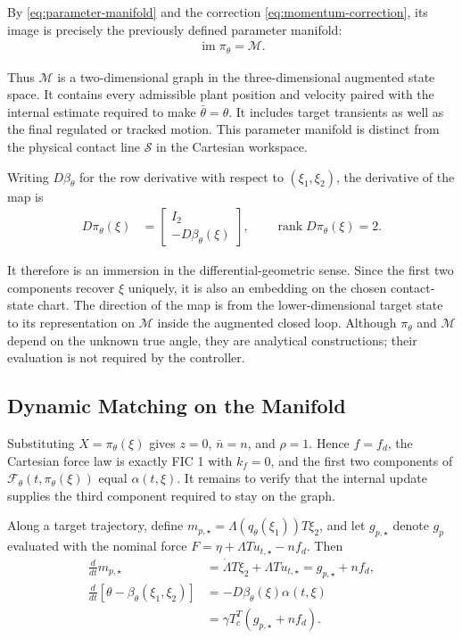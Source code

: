 \documentclass[10pt,journal,letterpaper]{IEEEtran}
\begin{document}
By \eqref{eq:parameter-manifold} and the correction \eqref{eq:momentum-correction}, its image is precisely the previously defined parameter manifold:
\begin{align*}
\operatorname{im}\pi_\theta=\mathcal M.
\end{align*}

Thus $\mathcal M$ is a two-dimensional graph in the three-dimensional augmented state space. It contains every admissible plant position and velocity paired with the internal estimate required to make $\bar\theta=\theta$. It includes target transients as well as the final regulated or tracked motion. This parameter manifold is distinct from the physical contact line $\mathcal S$ in the Cartesian workspace.

Writing $D\beta_\theta$ for the row derivative with respect to $(\xi_1,\xi_2)$, the derivative of the map is
\begin{align*}
D\pi_\theta(\xi)
&=\begin{bmatrix}I_2\\-D\beta_\theta(\xi)\end{bmatrix},
\qquad \operatorname{rank}D\pi_\theta(\xi)=2.
\end{align*}

It therefore is an immersion in the differential-geometric sense. Since the first two components recover $\xi$ uniquely, it is also an embedding on the chosen contact-state chart. The direction of the map is from the lower-dimensional target state to its representation on $\mathcal M$ inside the augmented closed loop. Although $\pi_\theta$ and $\mathcal M$ depend on the unknown true angle, they are analytical constructions; their evaluation is not required by the controller.

\subsection{Dynamic Matching on the Manifold}

Substituting $X=\pi_\theta(\xi)$ gives $z=0$, $\bar n=n$, and $\rho=1$. Hence $f=f_d$, the Cartesian force law is exactly FIC 1 with $k_f=0$, and the first two components of $\mathcal F_\theta(t,\pi_\theta(\xi))$ equal $\alpha(t,\xi)$. It remains to verify that the internal update supplies the third component required to stay on the graph.

Along a target trajectory, define $m_{p,\star}=\Lambda(q_\theta(\xi_1))T\xi_2$, and let $g_{p,\star}$ denote $g_p$ evaluated with the nominal force $F=\eta+\Lambda T u_{t,\star}-nf_d$. Then
\begin{align*}
\frac{d}{dt}m_{p,\star}
&=\dot\Lambda T\xi_2+\Lambda T u_{t,\star}
=g_{p,\star}+nf_d,\\
\frac{d}{dt}\left[\theta-\beta_\theta(\xi_1,\xi_2)\right]
&=-D\beta_\theta(\xi)\alpha(t,\xi)\\
&=\gamma T_c^T(g_{p,\star}+nf_d).
\end{align*}
\end{document}

